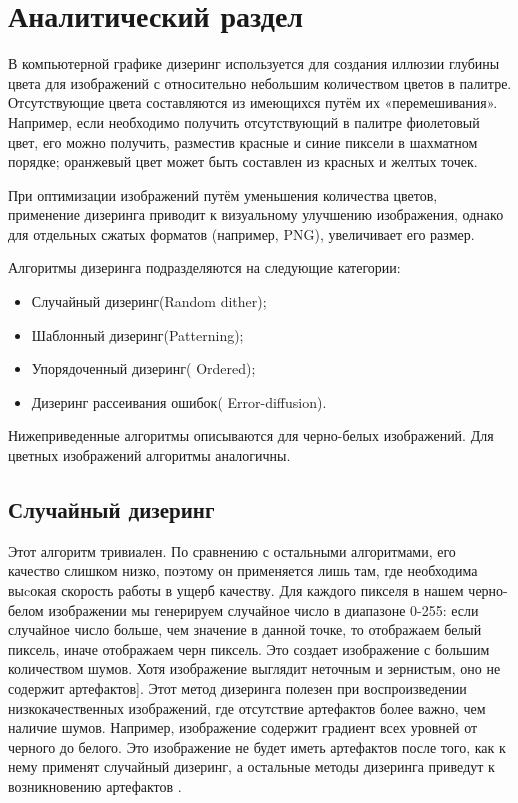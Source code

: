 \chapter{Аналитический раздел}
\label{cha:analysis}
%
%
В компьютерной графике дизеринг используется для создания иллюзии глубины цвета для изображений с относительно небольшим количеством цветов в палитре. Отсутствующие цвета составляются из имеющихся путём их «перемешивания». Например, если необходимо получить отсутствующий в палитре фиолетовый цвет, его можно получить, разместив красные и синие пиксели в шахматном порядке; оранжевый цвет может быть составлен из красных и желтых точек.

При оптимизации изображений путём уменьшения количества цветов, применение дизеринга приводит к визуальному улучшению изображения, однако для отдельных сжатых форматов (например, PNG), увеличивает его размер.


Алгоритмы дизеринга подразделяются на следующие категории:

\begin{itemize}
	\item Случайный  дизеринг(Random dither);
	\item Шаблонный дизеринг(Patterning);
	\item Упорядоченный дизеринг( Ordered);
	\item Дизеринг рассеивания ошибок( Error-diffusion).
\end{itemize}

Нижеприведенные алгоритмы описываются для черно-белых изображений. Для цветных изображений алгоритмы аналогичны.




\section{Случайный дизеринг}
Этот алгоритм тривиален.  По сравнению с остальными алгоритмами, его качество слишком низко, поэтому он применяется лишь там, где необходима  выcокая скорость работы в ущерб качеству.\cite{Dh} 
Для каждого пикселя в нашем черно-белом изображении мы генерируем случайное число в диапазоне 0-255: если случайное число больше, чем значение в данной точке, то отображаем белый пиксель, иначе отображаем черн пиксель.
Это создает изображение с большим количеством шумов. Хотя изображение выглядит неточным и зернистым, оно не содержит артефактов\cite{Dh}]. Этот метод дизеринга полезен при воспроизведении низкокачественных изображений, где отсутствие артефактов более важно, чем наличие шумов. Например, изображение содержит градиент всех уровней от черного до белого. Это изображение не будет иметь артефактов после того, как к нему применят случайный дизеринг, а остальные методы дизеринга приведут к возникновению артефактов \cite{Dh}. 

